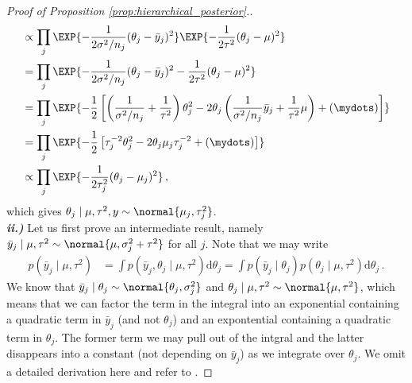 \begin{proof}[Proof of Proposition \ref{prop:hierarchical_posterior}.]
\begin{align*}
    &\propto \prod_j \EXP{-\frac{1}{2\sigma^2 / n_j} (\theta_j - \bar{y}_j)^2} \EXP{-\frac{1}{2\tau^2}(\theta_j - \mu)^2}\\
    &= \prod_j \EXP{-\frac{1}{2\sigma^2 / n_j} (\theta_j - \bar{y}_j)^2 -\frac{1}{2\tau^2}(\theta_j - \mu)^2}\\
    &= \prod_j \EXP{-\frac{1}{2}\left[\left(\frac{1}{\sigma^2/n_j} + \frac{1}{\tau^2}\right)\theta_j^2 - 2\theta_j\left(\frac{1}{\sigma^2/n_j}\bar{y}_j + \frac{1}{\tau^2}\mu\right) + (\mydots) \right]}\\
    &= \prod_j \EXP{-\frac{1}{2}\left[\tau_j^{-2} \theta_j^2 - 2\theta_j\mu_j\tau_j^{-2} + (\mydots) \right]}\\
    &\propto \prod_j \EXP{-\frac{1}{2\tau_j^2} (\theta_j - \mu_j)^2} \,,
  \end{align*}
which gives $\theta_j \mid \mu, \tau^2, y \sim \normal{\mu_j, \tau_j^2}$.\\

  \noindent
  \textbf{\emph{ii.)}} Let us first prove an intermediate result, namely $\bar{y}_j \mid \mu, \tau^2 \sim \normal{\mu, \sigma_j^2 + \tau^2}$ for all $j$.
  Note that we may write
  \begin{align*}
    p(\bar{y}_j \mid \mu, \tau^2) &= \int p(\bar{y}_j, \theta_j \mid \mu, \tau^2)\mathrm{d}\theta_j = \int p(\bar{y}_j \mid \theta_j) p(\theta_j \mid \mu, \tau^2)\mathrm{d}\theta_j \,.
  \end{align*}
  We know that $\bar{y}_j \mid \theta_j \sim \normal{\theta_j, \sigma_j^2}$ and $\theta_j \mid \mu, \tau^2 \sim \normal{\mu, \tau^2}$, which means that we can factor the term in the integral into an exponential containing a quadratic term in $\bar{y}_j$ (and not $\theta_j$) and an expontential containing a quadratic term in $\theta_j$.
  The former term we may pull out of the intgral and the latter disappears into a constant (not depending on $\bar{y}_j$) as we integrate over $\theta_j$.
  We omit a detailed derivation here and refer to \citet{gelmanbda04}.


\end{proof}

